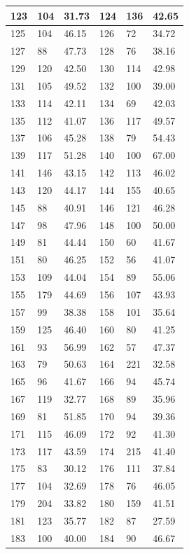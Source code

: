\documentclass[10.9pt]{article} %
\begin{document}
{\begin{longtable}{|p{2cm}|p{2cm}|p{2cm}|p{2cm}|p{2cm}|p{2cm}|}
\hline
123 & 104& 31.73 & 124 & 136& 42.65\\
\hline
125 & 104& 46.15 & 126 & 72& 34.72\\
\hline
127 & 88& 47.73 & 128 & 76& 38.16\\
\hline
129 & 120& 42.50 & 130 & 114& 42.98\\
\hline
131 & 105& 49.52 & 132 & 100& 39.00\\
\hline
133 & 114& 42.11 & 134 & 69& 42.03\\
\hline
135 & 112& 41.07 & 136 & 117& 49.57\\
\hline
137 & 106& 45.28 & 138 & 79& 54.43\\
\hline
139 & 117& 51.28 & 140 & 100& 67.00\\
\hline
141 & 146& 43.15 & 142 & 113& 46.02\\
\hline
143 & 120& 44.17 & 144 & 155& 40.65\\
\hline
145 & 88& 40.91 & 146 & 121& 46.28\\
\hline
147 & 98& 47.96 & 148 & 100& 50.00\\
\hline
149 & 81& 44.44 & 150 & 60& 41.67\\
\hline
151 & 80& 46.25 & 152 & 56& 41.07\\
\hline
153 & 109& 44.04 & 154 & 89& 55.06\\
\hline
155 & 179& 44.69 & 156 & 107& 43.93\\
\hline
157 & 99& 38.38 & 158 & 101& 35.64\\
\hline
159 & 125& 46.40 & 160 & 80& 41.25\\
\hline
161 & 93& 56.99 & 162 & 57& 47.37\\
\hline
163 & 79& 50.63 & 164 & 221& 32.58\\
\hline
165 & 96& 41.67 & 166 & 94& 45.74\\
\hline
167 & 119& 32.77 & 168 & 89& 35.96\\
\hline
169 & 81& 51.85 & 170 & 94& 39.36\\
\hline
171 & 115& 46.09 & 172 & 92& 41.30\\
\hline
173 & 117& 43.59 & 174 & 215& 41.40\\
\hline
175 & 83& 30.12 & 176 & 111& 37.84\\
\hline
177 & 104& 32.69 & 178 & 76& 46.05\\
\hline
179 & 204& 33.82 & 180 & 159& 41.51\\
\hline
181 & 123& 35.77 & 182 & 87& 27.59\\
\hline
183 & 100& 40.00 & 184 & 90& 46.67\\

\end{longtable}}
\end{document}
